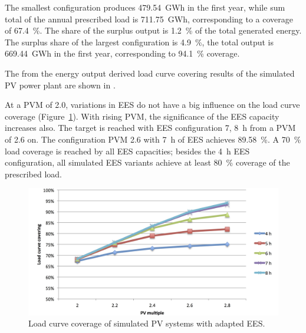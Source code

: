 The smallest configuration produces \SI{479.54}{GWh} in the first year, while sum total of the annual prescribed load is \SI{711.75}{GWh}, corresponding to a coverage of \SI{67.4}{\percent}. The share of the surplus output is \SI{1.2}{\percent} of the total generated energy. The surplus share of the largest configuration is \SI{4.9}{\percent}, the total output is \SI{669.44}{GWh} in the first year, corresponding to \SI{94.1}{\percent} coverage.


The from the energy output derived load curve covering results of the simulated PV power plant are shown in .

At a PVM of \num{2.0}, variations in EES do not have a big influence on the load curve coverage (Figure~\ref{PV_LCCF}). With rising PVM, the significance of the EES capacity increases also. The target is reached with EES configuration 7, \SI{8}{h} from a PVM of 2.6 on. The configuration PVM \num{2.6} with \SI{7}{h} of EES achieves \SI{89.58}{\percent}. A \SI{70}{\percent} load coverage is reached by all EES capacities; besides the \SI{4}{h} EES configuration, all simulated EES variants achieve at least \SI{80}{\percent} coverage of the prescribed load. 


\begin{figure}[htbp]  
\centering
\includegraphics[width=1\linewidth]{FIG/PV_LCCF}
\caption[Load curve coverage of simulated PV systems with adapted EES.]{Load curve coverage of simulated PV systems with adapted EES.}\label{PV_LCCF}
\end{figure}
\pagebreak
